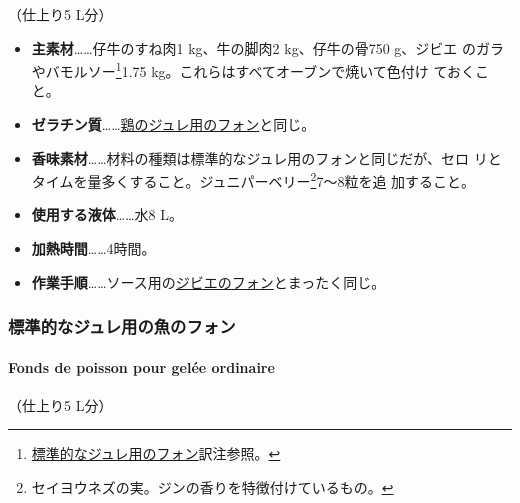 \begin{recette}
（仕上り5 L分）

\begin{itemize}
\item
  \textbf{主素材}\ldots{}\ldots{}仔牛のすね肉1 kg、牛の脚肉2
  kg、仔牛の骨750 g、ジビエ のガラやバモルソー\footnote{\protect\hyperlink{fonds-pour-gelee-ordinaire}{標準的なジュレ用のフォン}訳注参照。}1.75
  kg。これらはすべてオーブンで焼いて色付け ておくこと。
\item
  \textbf{ゼラチン質}\ldots{}\ldots{}\protect\hyperlink{fonds-pour-gelee-de-volaille}{鶏のジュレ用のフォン}と同じ。
\item
  \textbf{香味素材}\ldots{}\ldots{}材料の種類は標準的なジュレ用のフォンと同じだが、セロ
  リとタイムを\untiers{}量多くすること。ジュニパーベリー\footnote{セイヨウネズの実。ジンの香りを特徴付けているもの。}7〜8粒を追
  加すること。
\item
  \textbf{使用する液体}\ldots{}\ldots{}水8 L。
\item
  \textbf{加熱時間}\ldots{}\ldots{}4時間。
\item
  \textbf{作業手順}\ldots{}\ldots{}ソース用の\protect\hyperlink{fonds-de-gibier}{ジビエのフォン}とまったく同じ。
\end{itemize}

\maeaki

\hypertarget{ux6a19ux6e96ux7684ux306aux30b8ux30e5ux30ecux7528ux306eux9b5aux306eux30d5ux30a9ux30f3}{%
\subsubsection{標準的なジュレ用の魚のフォン}\label{ux6a19ux6e96ux7684ux306aux30b8ux30e5ux30ecux7528ux306eux9b5aux306eux30d5ux30a9ux30f3}}

\hypertarget{fonds-de-poisson-pour-gelee-ordinaire}{%
\paragraph{Fonds de poisson pour gelée
ordinaire}\label{fonds-de-poisson-pour-gelee-ordinaire}}


（仕上り5 L分）


\end{recette}
